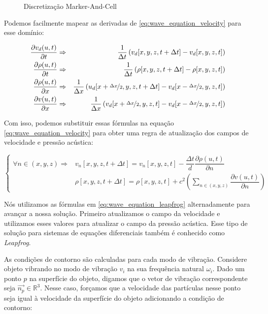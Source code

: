\begin{figure}[ht]
\centering

\caption[Discretização Marker-And-Cell]{Discretização Marker-And-Cell}
\label{fig:macgrid}
\end{figure}

Podemos facilmente mapear as derivadas de \eqref{eq:wave_equation_velocity} para esse domínio:

\begin{eqnarray*}
	\frac{\partial v_{d}(u, t)}{\partial t} &\Rightarrow& \frac{1}{\Delta t}\left( v_{d}[x, y, z, t + \Delta t] - v_{d}[x, y, z, t]\right)\\
	\frac{\partial \rho(u, t)}{\partial t} &\Rightarrow& \frac{1}{\Delta t}\left( \rho[x, y, z, t + \Delta t] - \rho[x, y, z, t]\right) \\
	\frac{\partial \rho(u, t)}{\partial x} &\Rightarrow& \frac{1}{\Delta x}\left( u_{d}[x + \nicefrac{\Delta x}{2}, y, z, t + \Delta t] - v_{d}[x-\nicefrac{\Delta x}{2}, y, z, t]\right)\\
	\frac{\partial v(u, t)}{\partial x} &\Rightarrow& \frac{1}{\Delta x}\left( v_{d}[x+\nicefrac{\Delta x}{2}, y, z, t] - v_{d}[x-\nicefrac{\Delta x}{2}, y, z, t]\right)
\end{eqnarray*}

Com isso, podemos substituir essas fórmulas na equação \eqref{eq:wave_equation_velocity} para obter uma regra de atualização dos campos de velocidade e pressão acústica:

\begin{equation} \label{eq:wave_equation_leapfrog}
	\begin{cases}
		\forall n \in (x, y, z) \Rightarrow& v_{n}[x, y, z, t+\Delta t] = v_{n}[x, y, z, t] - \dfrac{\Delta t}{d}\dfrac{\partial \rho(u, t)}{\partial n}\\
		&\rho[x, y, z, t+\Delta t] = \rho[x, y, z, t] + c^2 \left( \sum_{n \in (x, y, z)} \dfrac{\partial v(u, t)}{\partial n} \right)
	\end{cases}
\end{equation}

Nós utilizamos as fórmulas em \eqref{eq:wave_equation_leapfrog} alternadamente para avançar a nossa solução. Primeiro atualizamos o campo da velocidade e utilizamos esses valores para atualizar o campo da pressão acústica. Esse tipo de solução para sistemas de equações diferenciais também é conhecido como \emph{Leapfrog}.

As condições de contorno são calculadas para cada modo de vibração. Considere objeto vibrando no modo de vibração $v_i$ na sua frequência natural $\omega_i$. Dado um ponto $p$ na superfície do objeto, digamos que o vetor de vibração correspondente seja $\vec{n_p} \in \mathbb{R}^3$. Nesse caso, forçamos que a velocidade das partículas nesse ponto seja igual à velocidade da superfície do objeto adicionando a condição de contorno:

